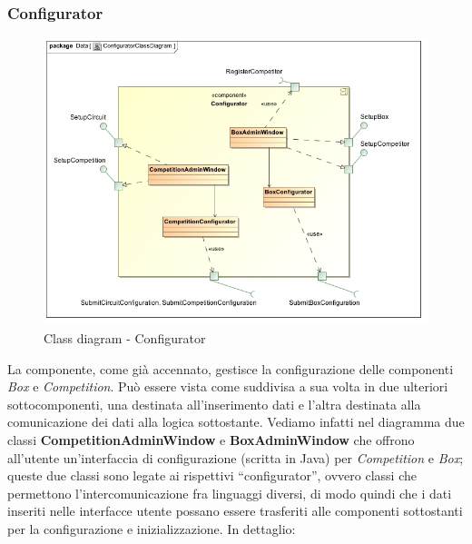 \subsubsection{Configurator}
\begin{center}
\begin{figure}[h!]
	\includegraphics[scale=0.50]{img/ClassDiagrams/ConfiguratorClassDiagram.jpg}
\caption{Class diagram - Configurator}
\end{figure}
\end{center}
La componente, come gi\`{a} accennato, gestisce la configurazione delle componenti \emph{Box} e \emph{Competition}. Pu\`{o} essere vista come suddivisa
a sua volta in due ulteriori sottocomponenti, una destinata all'inserimento dati e l'altra destinata alla comunicazione dei dati alla logica
sottostante. Vediamo infatti nel diagramma due classi \textbf{CompetitionAdminWindow} e \textbf{BoxAdminWindow} che offrono all'utente
un'interfaccia di configurazione (scritta in Java) per \emph{Competition} e \emph{Box}; queste due classi sono legate ai rispettivi ``configurator'',
ovvero classi che permettono l'intercomunicazione fra linguaggi diversi, di modo quindi che i dati inseriti nelle interfacce utente
possano essere trasferiti alle componenti sottostanti per la configurazione e inizializzazione. In dettaglio:

